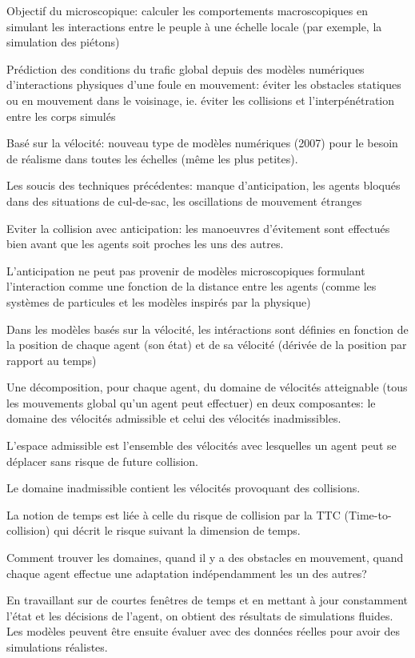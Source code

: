 \documentclass[11pt]{report}
\begin{document}
Objectif du microscopique: calculer les comportements macroscopiques en simulant les interactions entre le peuple à une échelle locale (par exemple, la simulation des piétons)

Prédiction des conditions du trafic global depuis des modèles numériques d'interactions physiques d'une foule en mouvement: éviter les obstacles statiques ou en mouvement dans le voisinage, ie. éviter les collisions et l'interpénétration entre les corps simulés

Basé sur la vélocité: nouveau type de modèles numériques (2007) pour le besoin de réalisme dans toutes les échelles (même les plus petites).

Les soucis des techniques précédentes: manque d'anticipation, les agents bloqués dans des situations de cul-de-sac, les oscillations de mouvement étranges

Eviter la collision avec anticipation: les manoeuvres d'évitement sont effectués bien avant que les agents soit proches les uns des autres.

L'anticipation ne peut pas provenir de modèles microscopiques formulant l'interaction comme une fonction de la distance entre les agents (comme les systèmes de particules et les modèles inspirés par la physique)

Dans les modèles basés sur la vélocité, les intéractions sont définies en fonction de la position de chaque agent (son état) et de sa vélocité (dérivée de la position par rapport au temps)

Une décomposition, pour chaque agent, du domaine de vélocités atteignable (tous les mouvements global qu'un agent peut effectuer) en deux composantes: le domaine des vélocités admissible et celui des vélocités inadmissibles.

L'espace admissible est l'ensemble des vélocités avec lesquelles un agent peut se déplacer sans risque de future collision.

Le domaine inadmissible contient les vélocités provoquant des collisions.

La notion de temps est liée à celle du risque de collision par la TTC (Time-to-collision) qui  décrit le risque suivant la dimension de temps.

Comment trouver les domaines, quand il y a des obstacles en mouvement, quand chaque agent effectue une adaptation indépendamment les un des autres?

En travaillant sur de courtes fenêtres de temps et en mettant à jour constamment l'état et les décisions de l'agent, on obtient des résultats de simulations fluides. Les modèles peuvent être ensuite évaluer avec des données réelles pour avoir des simulations réalistes.
\end{document}
